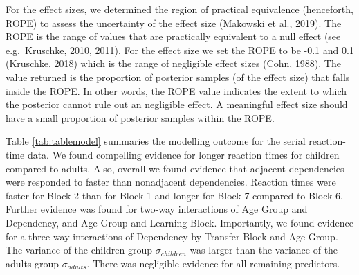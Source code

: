 \documentclass[
  english,
  man,floatsintext]{apa7}
\begin{document}
For the effect sizes, we determined the region of practical equivalence (henceforth, ROPE) to assess the uncertainty of the effect size (Makowski et al., 2019). The ROPE is the range of values that are practically equivalent to a null effect (see e.g.~Kruschke, 2010, 2011). For the effect size we set the ROPE to be -0.1 and 0.1 (Kruschke, 2018) which is the range of negligible effect sizes (Cohn, 1988). The value returned is the proportion of posterior samples (of the effect size) that falls inside the ROPE. In other words, the ROPE value indicates the extent to which the posterior cannot rule out an negligible effect. A meaningful effect size should have a small proportion of posterior samples within the ROPE.

Table \ref{tab:tablemodel} summaries the modelling outcome for the serial reaction-time data. We found compelling evidence for longer reaction times for children compared to adults. Also, overall we found evidence that adjacent dependencies were responded to faster than nonadjacent dependencies. Reaction times were faster for Block 2 than for Block 1 and longer for Block 7 compared to Block 6. Further evidence was found for two-way interactions of Age Group and Dependency, and Age Group and Learning Block. Importantly, we found evidence for a three-way interactions of Dependency by Transfer Block and Age Group. The variance of the children group \(\sigma_{children}\) was larger than the variance of the adults group \(\sigma_{adults}\). There was negligible evidence for all remaining predictors.
\end{document}
